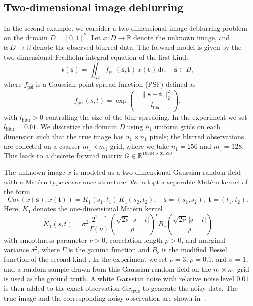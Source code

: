 \documentclass[]{myarticle}
\begin{document}
\subsection{Two-dimensional image deblurring}
In the second example, we consider a two-dimensional image deblurring problem on the domain $D = [0,1]^2$. Let $x : D \to \mathbb{R}$ denote the unknown image, and $b : D \to \mathbb{R}$ denote the observed blurred data. The forward model is given by the two-dimensional Fredholm integral equation of the first kind:
\begin{equation}\label{eq:forward_model}
    b(\boldsymbol{s}) = 
    \iint_D f_{\mathrm{psf}}(\boldsymbol{s},\boldsymbol{t})\, x(\boldsymbol{t})\,\mathrm{d}t, 
    \quad \boldsymbol{s} \in D,
\end{equation}
where $f_{\mathrm{psf}}$ is a Gaussian point spread function (PSF) defined as
\begin{equation}\label{eq:psf}
    f_{\mathrm{psf}}(s,t)
    = \exp\!\left(-\frac{\|\boldsymbol{s} - \boldsymbol{t}\|_2^2}{l_{\mathrm{blur}}}\right),
\end{equation}
with $l_{\mathrm{blur}} > 0$ controlling the size of the blur spreading. In the experiment we set $l_{\mathrm{blur}}=0.01$. We discretize the domain $D$ using $n_1$ uniform grids on each dimension such that the true image has $n_1\times n_1$ pixels; the blurred observations are collected on a coarser $m_1 \times m_1$ grid, where we take $n_1 = 256$ and $m_1 = 128$. This leads to a discrete forward matrix $G \in \mathbb{R}^{16384 \times 65536}$.

The unknown image $x$ is modeled as a two-dimensional Gaussian random field with a Matérn-type covariance structure. We adopt a separable Matérn kernel of the form
\begin{equation}\label{eq:separable_matern}
    \mathrm{Cov}(x(\boldsymbol{s}), x(\boldsymbol{t}))
    = K_1(s_1,t_1)\, K_1(s_2,t_2), \quad \boldsymbol{s}=(s_1,s_2),\; \boldsymbol{t}=(t_1,t_2).
\end{equation}
Here, $K_1$ denotes the one-dimensional Matérn kernel
\begin{equation}\label{eq:matern1d}
    K_1(s,t)
    = \sigma^2 \frac{2^{1-\nu}}{\Gamma(\nu)}\left( \frac{\sqrt{2\nu}\, |s-t|}{\rho} \right)^{\nu}
    B_{\nu}\!\left( \frac{\sqrt{2\nu}\, |s-t|}{\rho} \right)
\end{equation}
with smoothness parameter $\nu > 0$, correlation length $\rho > 0$, and marginal variance $\sigma^2$, where $\Gamma$ is the gamma function and $B_{\nu}$ is the modified Bessel function of the second kind \cite{Williams2006gaussian}. In the experiment we set $\nu = 3$, $\rho = 0.1$, and $\sigma = 1$, and a random sample drawn from this Gaussian random field on the $n_1 \times n_1$ grid is used as the ground truth. A white Gaussian noise with relative noise level $0.01$ is then added to the exact observation $G x_{\mathrm{true}}$ to generate the noisy data. The true image and the corresponding noisy observation are shown in~.
\end{document}
